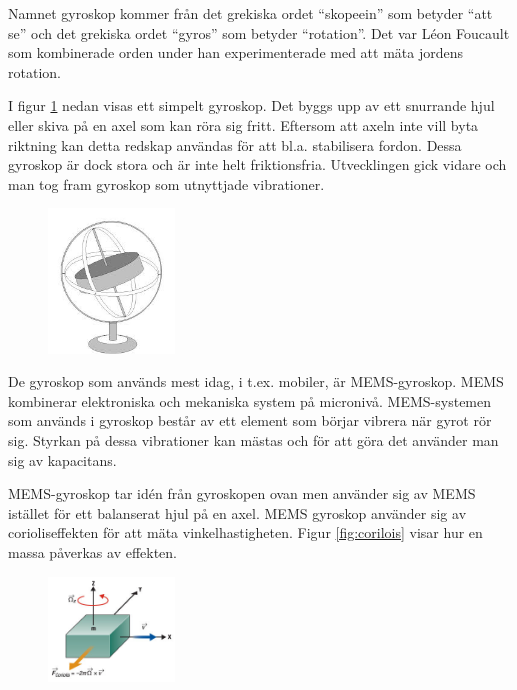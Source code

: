 \documentclass[a4paper,12pt,fleqn]{article}
\begin{document}
Namnet  gyroskop kommer från det grekiska ordet “skopeein” som betyder “att se” och det grekiska ordet “gyros” som betyder “rotation”. Det var Léon Foucault som kombinerade orden under han experimenterade med att mäta jordens rotation.

I figur \ref{fig:gyro} nedan visas ett simpelt gyroskop. Det byggs upp av ett snurrande hjul eller skiva på en axel som kan röra sig fritt. Eftersom att axeln inte vill byta riktning kan detta redskap användas för att bl.a. stabilisera fordon. Dessa gyroskop är dock stora och är inte helt friktionsfria. Utvecklingen gick vidare och man tog fram gyroskop som utnyttjade vibrationer.

\begin{figure}[h]
\label{fig:gyro}
\caption{}
\includegraphics[width=0.3\textwidth]
{gyro.jpeg}
\end{figure}

De gyroskop som används mest idag, i t.ex. mobiler, är MEMS-gyroskop. MEMS kombinerar elektroniska och mekaniska system på micronivå. MEMS-systemen som används i gyroskop består av ett element som börjar vibrera när gyrot rör sig. Styrkan på dessa vibrationer kan mästas och för att göra det använder man sig av kapacitans.

MEMS-gyroskop tar idén från gyroskopen ovan men använder sig av MEMS istället för ett balanserat hjul på en axel. MEMS gyroskop använder sig av corioliseffekten för att mäta vinkelhastigheten. Figur \ref{fig:corilois} visar hur en massa påverkas av effekten.
\begin{figure}[h]
\label{fig:coriolis}
\caption{}
\includegraphics[width=0.3\textwidth]
{coriolis.png}
\end{figure}
\end{document}
